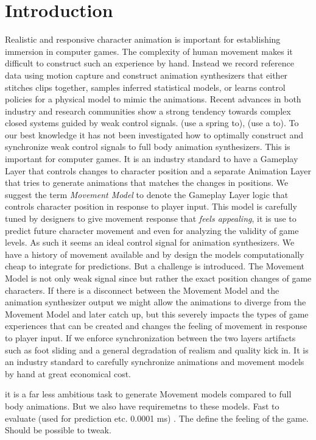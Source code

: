\section{Introduction}
Realistic and responsive character animation is important for establishing immersion in computer games. The complexity of human movement makes it difficult to construct such an experience by hand. Instead we record reference data using motion capture and construct animation synthesizers that either stitches clips together, samples inferred statistical models, or learns control policies for a physical model to mimic the animations. Recent advances in both industry and research communities show a strong tendency towards complex closed systems guided by weak control signals. (use a spring to), (use a to).
To our best knowledge it has not been investigated how to optimally construct and synchronize weak control signals to full body animation synthesizers. This is important for computer games. It is an industry standard to have a Gameplay Layer that controls changes to character position and a separate Animation Layer that tries to generate animations that matches the changes in positions. We suggest the term \textit{Movement Model} to denote the Gameplay Layer logic that controls character position in response to player input. This model is carefully tuned by designers to give movement response that \textit{feels appealing}, it is use to predict future character movement and even for analyzing the validity of game levels. As such it seems an ideal control signal for animation synthesizers. We have a history of movement available and by design the models computationally cheap to integrate for predictions. But a challenge is introduced. The Movement Model is not only weak signal since but rather the exact position changes of game characters. If there is a disconnect between the Movement Model and the animation synthesizer output we might allow the animations to diverge from the Movement Model and later catch up, but this severely impacts the types of game experiences that can be created and changes the feeling of movement in response to player input. If we enforce synchronization between the two layers artifacts such as foot sliding and a general degradation of realism and quality kick in. It is an industry standard to carefully synchronize animations and movement models by hand at great economical cost.

it is a far less ambitious task to generate Movement models compared to full body animations. But we also have requiremetns to these models. Fast to evaluate (used for prediction etc. 0.0001 ms) . The define the feeling of the game. Should be possible to tweak. 


